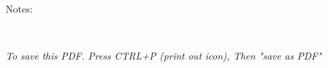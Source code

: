 \newpage

\begin{Form}
Notes: \vspace{3mm} 

\TextField[
  name=feedback,
  multiline=true,
  width=15cm,
  height=20cm
]{}
\end{Form}\\
\vspace{1em}


\vspace{3mm}

\textit{To save this PDF. Press CTRL+P (print out icon), Then "save as PDF"}